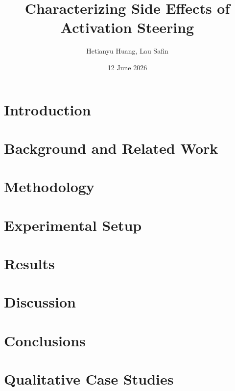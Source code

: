\documentclass[11pt,a4paper]{article}
\author{Hetianyu Huang, Lau Safin}
\title{Characterizing Side Effects of Activation Steering}
\subtitle{}
\date{12 June 2026}
\begin{document}
\begingroup
  \selectfont
  \maketitle
\endgroup

\tableofcontents
\newpage
\begin{abstract}

\end{abstract}
\newpage
\section{Introduction}\label{sec:introduction}

\section{Background and Related Work}\label{sec:background}


\section{Methodology}\label{sec:methodology}



\section{Experimental Setup}\label{sec:experimental-setup}



\section{Results}\label{sec:results}


\section{Discussion}\label{sec:discussion}


\section{Conclusions}\label{sec:conclusions}






\clearpage
\appendix
\section{Qualitative Case Studies}\label{ap:case_studies}

\end{document}
